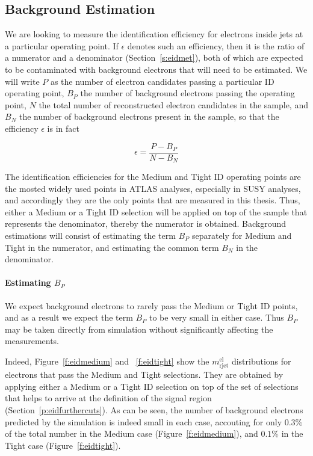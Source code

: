 \subsection{Background Estimation}\label{s:eidbe}

We are looking to measure the identification efficiency for electrons inside
jets at a particular operating point. If $\epsilon$ denotes such an efficiency,
then it is the ratio of a numerator and a denominator (Section~\ref{s:eidmet}),
both of which are expected to be contaminated with background electrons that
will need to be estimated. We will write $P$ as the number of electron
candidates passing a particular ID operating point, $B_P$ the number of
background electrons passing the operating point, $N$ the total number of
reconstructed electron candidates in the sample, and $B_N$ the number of
background electrons present in the sample, so that the efficiency $\epsilon$
is in fact

\begin{equation}\label{eqn:effo}
	\epsilon = \frac{P-B_P}{N-B_N}
\end{equation}

The identification efficiencies for the Medium and Tight ID operating points
are the mosted widely used points in ATLAS analyses, especially in SUSY
analyses, and accordingly they are the only points that are measured in this
thesis. Thus, either a Medium or a Tight ID selection will be applied on top of
the sample that represents the denominator, thereby the numerator is obtained.
Background estimations will consist of estimating the term $B_P$ separately for
Medium and Tight in the numerator, and estimating the common term $B_N$ in the
denominator.

\paragraph{Estimating $B_P$} We expect background electrons to rarely pass the
Medium or Tight ID points, and as a result we expect the term $B_P$ to be very
small in either case. Thus $B_P$ may be taken directly from simulation without
significantly affecting the measurements.

Indeed, Figure~\ref{f:eidmedium} and ~\ref{f:eidtight} show the $m_{\text{rjet}}^{\text{el}}$
distributions for electrons that pass the Medium and Tight selections. They are
obtained by applying either a Medium or a Tight ID selection on top of the set
of selections that helps to arrive at the definition of the signal region
(Section~\ref{p:eidfurthercuts}). As can be seen, the number of background
electrons predicted by the simulation is indeed small in each case, accouting
for only $0.3\%$ of the total number in the Medium case
(Figure~\ref{f:eidmedium}), and $0.1\%$ in the Tight case (Figure~\ref{f:eidtight}).

